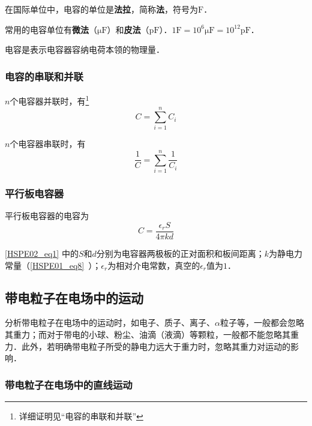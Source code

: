 在国际单位中，电容的单位是\textbf{法拉}，简称\textbf{法}，符号为$\mathrm{F}$．

常用的电容单位有\textbf{微法}（$\mathrm{\mu F}$）和\textbf{皮法}（$\mathrm{pF}$）．$1\mathrm{F}=10^6 \mathrm{\mu F}=10^{12} \mathrm{pF}$．

电容是表示电容器容纳电荷本领的物理量．

\subsubsection{电容的串联和并联}
$n$个电容器并联时，有\footnote{详细证明见“电容的串联和并联”}
\begin{equation}
C=\sum_{i=1}^{n}C_i
\end{equation}

$n$个电容器串联时，有
\begin{equation}
\frac{1}{C}=\sum_{i=1}^{n}\frac{1}{C_i}
\end{equation}

\subsubsection{平行板电容器}

平行板电容器的电容为
\begin{equation}\label{HSPE02_eq1}
C = \frac {\epsilon_r S}{4\pi kd}
\end{equation}

\autoref{HSPE02_eq1} 中的$S$和$d$分别为电容器两极板的正对面积和板间距离；$k$为静电力常量（\autoref{HSPE01_eq8}~）；$\epsilon_r$为相对介电常数，真空的$\epsilon_r$值为$1$．

\subsection{带电粒子在电场中的运动}

分析带电粒子在电场中的运动时，如电子、质子、离子、$\alpha$粒子等，一般都会忽略其重力；而对于带电的小球、粉尘、油滴（液滴）等颗粒，一般都不能忽略其重力．此外，若明确带电粒子所受的静电力远大于重力时，忽略其重力对运动的影响．

\subsubsection{带电粒子在电场中的直线运动}

